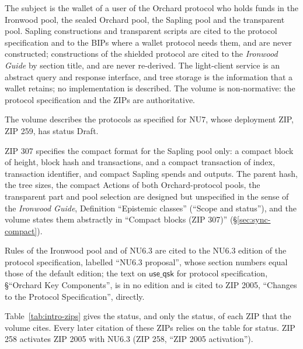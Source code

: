 \documentclass[11pt,a4paper]{article}
\theoremstyle{definition}
\begin{document}
The subject is the wallet of a user of the Orchard protocol who holds funds
in the Ironwood pool, the sealed Orchard pool, the Sapling pool and the
transparent pool. Sapling constructions and transparent scripts are cited to
the protocol specification and to the BIPs where a wallet protocol needs
them, and are never constructed; constructions of the shielded protocol are
cited to the \emph{Ironwood Guide} by section title, and are never
re-derived. The light-client service is an abstract query and response
interface, and tree storage is the information that a wallet retains; no
implementation is described. The volume is non-normative: the protocol
specification and the ZIPs are authoritative.

The volume describes the protocols as specified for NU7, whose deployment
ZIP, ZIP 259, has status Draft.

ZIP 307 specifies the compact format for the Sapling pool only: a compact
block of height, block hash and transactions, and a compact transaction of
index, transaction identifier, and compact Sapling spends and outputs. The
parent hash, the tree sizes, the compact Actions of both Orchard-protocol
pools, the transparent part and pool selection are designed but unspecified
in the sense of the \emph{Ironwood
Guide}, Definition ``Epistemic classes'' (``Scope and status''), and the
volume states them abstractly in ``Compact blocks (ZIP 307)''
(\S\ref{sec:sync-compact}).

Rules of the Ironwood pool and of NU6.3 are cited to the NU6.3 edition of
the protocol specification, labelled ``NU6.3 proposal'', whose section
numbers equal those of the default edition; the text on
$\mathsf{use\_qsk}$ for protocol specification, \S``Orchard Key
Components'', is in no edition and is cited to ZIP 2005, ``Changes to the
Protocol Specification'', directly.

Table~\ref{tab:intro-zips} gives the status, and only the status, of each
ZIP that the volume cites. Every later citation of these ZIPs relies on the
table for status. ZIP 258 activates ZIP 2005 with NU6.3 (ZIP 258, ``ZIP 2005
activation'').
\end{document}
